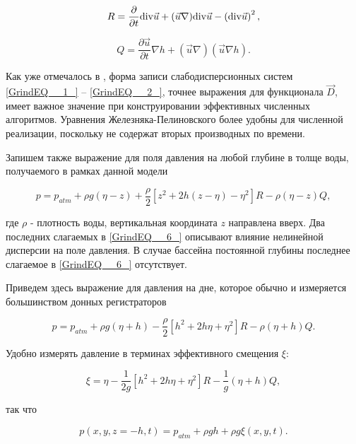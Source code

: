 \begin{equation} \label{GrindEQ__4_}
R=\frac{\partial }{\partial t} {\rm div}\vec{u}+(\vec{u}\nabla ){\rm div}\vec{u}-\left({\rm div}\vec{u}\right)^{2} ,
\end{equation}

\begin{equation} \label{GrindEQ__5_}
Q=\frac{\partial \vec{u}}{\partial t} \nabla h+(\vec{u}\nabla )(\vec{u}\nabla h).
\end{equation}


Как уже отмечалось в \cite{Fedotova_2008}, форма записи слабодисперсионных систем \eqref{GrindEQ__1_} -- \eqref{GrindEQ__2_}, точнее выражения для функционала $\vec{D}$, имеет важное значение при конструировании эффективных численных алгоритмов. Уравнения Железняка-Пелиновского более удобны для численной реализации, поскольку не содержат вторых производных по времени.

 Запишем также выражение для поля давления на любой глубине в толще воды, получаемого в рамках данной модели \cite{Zhel_1985}\cite{Zhel_Pel_1985}


\begin{equation} \label{GrindEQ__6_}
p=p_{atm} +\rho g(\eta -z)+\frac{\rho }{2} \left[z^{2} +2h(z-\eta )-\eta ^{2} \right]R-\rho (\eta -z)Q,
\end{equation}


 где $\rho$ - плотность воды, вертикальная координата $z$ направлена вверх. Два последних слагаемых в \eqref{GrindEQ__6_} описывают влияние нелинейной дисперсии на поле давления. В случае бассейна постоянной глубины последнее слагаемое в \eqref{GrindEQ__6_} отсутствует.

 Приведем здесь выражение для давления на дне, которое обычно и измеряется большинством донных регистраторов

\begin{equation} \label{GrindEQ__7_}
p=p_{atm} +\rho g(\eta +h)-\frac{\rho }{2} \left[h^{2} +2h\eta +\eta ^{2} \right]R-\rho (\eta +h)Q.
\end{equation}


Удобно измерять давление в терминах эффективного смещения $\xi$:

\begin{equation} \label{GrindEQ__8_}
\xi =\eta -\frac{1}{2g} \left[h^{2} +2h\eta +\eta ^{2} \right]R-\frac{1}{g} (\eta +h)Q,
\end{equation}


так что

\begin{equation} \label{GrindEQ__9_}
p(x,y,z=-h,t)=p_{atm} +\rho gh+\rho g\xi (x,y,t).
\end{equation}


